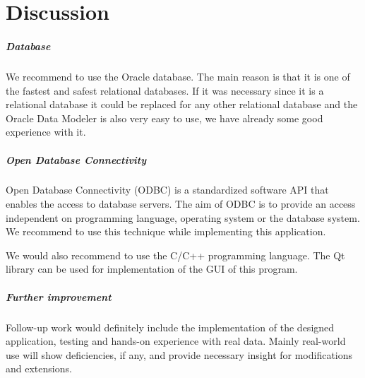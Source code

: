  
\chapter{Discussion} \label{Discussion}

\paragraph{Database} %

We recommend to use the Oracle database. The main reason is that it is one of the fastest and safest relational databases. If it was necessary since it is a relational database it could be replaced for any other relational database and the Oracle Data Modeler is also very easy to use, we have already some good experience with it. 

\paragraph{Open Database Connectivity}
Open Database Connectivity (ODBC) is a standardized software API that enables the access to database servers. The aim of ODBC is to provide an access independent on programming language, operating system or the database system. We recommend to use this technique while implementing this application. 

We would also recommend to use the C/C++ programming language. The Qt library can be used for implementation of the GUI of this program.

\paragraph*{Further improvement}
Follow-up work would definitely include the implementation of the designed application, testing and hands-on experience with real data.
Mainly real-world use will show deficiencies, if any, and provide necessary insight for modifications and extensions.


